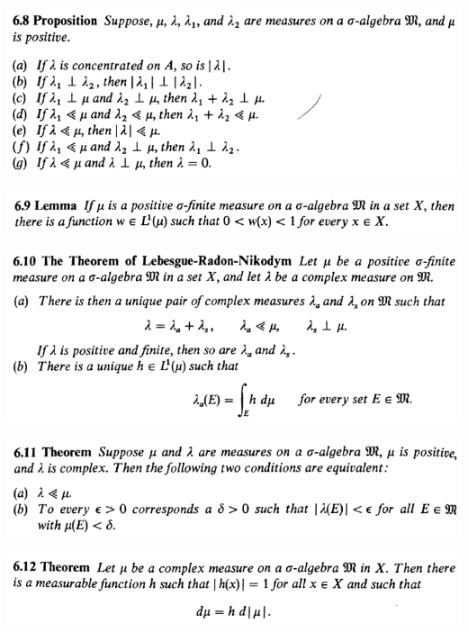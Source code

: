 \documentclass[12pt]{article}
\begin{document}
		\begin{center}
		\includegraphics{6ponto8}
		\end{center}

		\begin{center}
		\includegraphics{6ponto9}
		\end{center}

		\begin{center}
		\includegraphics{6ponto10}
		\end{center}

		\begin{center}
		\includegraphics{6ponto11}
		\end{center}

		\begin{center}
		\includegraphics{6ponto12}
		\end{center}
\end{document}
